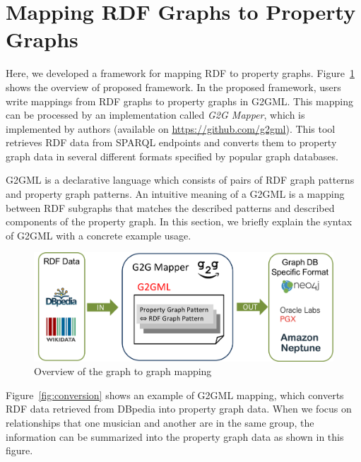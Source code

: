 \documentclass[runningheads]{llncs}
\begin{document}
\section{Mapping RDF Graphs to Property Graphs}

Here, we developed a framework for mapping RDF to property graphs.
Figure~\ref{fig:dataflow} shows the overview of proposed framework.
In the proposed framework, users write mappings from RDF graphs to property graphs in G2GML.
This mapping can be processed by an implementation called \textit{G2G Mapper}, which is implemented by authors (available on \url{https://github.com/g2gml}). This tool retrieves RDF data from SPARQL endpoints and converts them to property graph data in several different formats specified by popular graph databases.

G2GML is a declarative language which consists of pairs of RDF graph patterns and property graph patterns. 
An intuitive meaning of a G2GML is a mapping between RDF subgraphs that matches the described patterns and described components of the property graph. In this section, we briefly explain the syntax of G2GML with a concrete example usage.

\begin{figure}
\center
\includegraphics[width=1.0\textwidth]{dataflow.png}
\caption{Overview of the graph to graph mapping}
\label{fig:dataflow}
\end{figure}


Figure~\ref{fig:conversion} shows an example of G2GML mapping, which converts RDF data retrieved from DBpedia into property graph data. When we focus on relationships that one musician and another are in the same group, the information can be summarized into the property graph data as shown in this figure.
\end{document}

